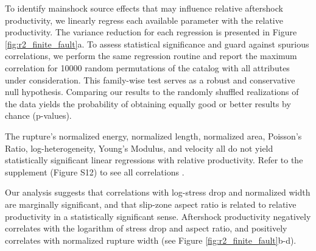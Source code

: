 \documentclass[draft]{agujournal2018}
\begin{document}
    To identify mainshock source effects that may influence relative aftershock productivity, we linearly regress each available parameter with the relative productivity. The variance reduction for each regression is presented in Figure \ref{fig:r2_finite_fault}a. To assess statistical significance and guard against spurious correlations, we perform the same regression routine and report the maximum correlation for 10000 random permutations of the catalog with all attributes under consideration. This family-wise test serves as a robust and conservative null hypothesis. Comparing our results to the randomly shuffled realizations of the data yields the probability of obtaining equally good or better results by chance (p-values).
    
    The rupture's normalized energy, normalized length, normalized area, Poisson's Ratio, log-heterogeneity, Young's Modulus, and velocity all do not yield statistically significant linear regressions with relative productivity. Refer to the supplement (Figure S12) to see all correlations \citep{Convers2011GlobalMid2010, Hayes2017}.

    Our analysis suggests that correlations with log-stress drop and normalized width are mar\-gi\-nally significant, and that slip-zone aspect ratio is related to relative productivity in a statistically significant sense. Aftershock productivity negatively correlates with the logarithm of stress drop and aspect ratio, and positively correlates with normalized rupture width (see Figure  \ref{fig:r2_finite_fault}b-d).
    
\end{document}
